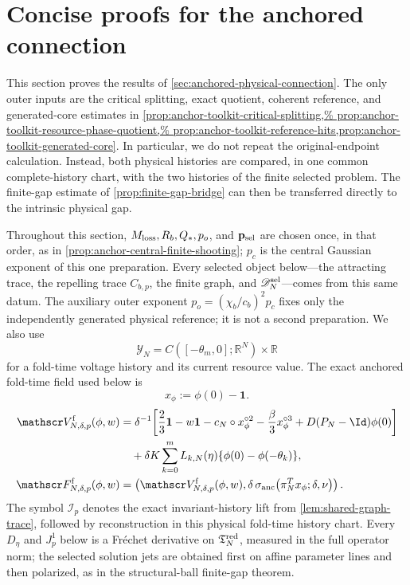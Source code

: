 \section{Concise proofs for the anchored connection}
\label{sec:lean-anchor-proofs}

This section proves the results of
\cref{sec:anchored-physical-connection}.  The only outer inputs are the
critical splitting, exact quotient, coherent reference, and generated-core
estimates in
\cref{prop:anchor-toolkit-critical-splitting,%
prop:anchor-toolkit-resource-phase-quotient,%
prop:anchor-toolkit-reference-hits,prop:anchor-toolkit-generated-core}.
In particular, we do not repeat
the original-endpoint calculation.  Instead, both physical histories are
compared, in one common complete-history chart, with the two histories of
the finite selected problem.  The finite-gap estimate of
\cref{prop:finite-gap-bridge} can then be transferred directly to the
intrinsic physical gap.

Throughout this section, \(M_{\rm loss},R_b,Q_*,p_o\), and
\(\mathbf p_{\rm sel}\) are chosen once, in that order, as in
\cref{prop:anchor-central-finite-shooting}; \(p_c\) is the central Gaussian
exponent of this one preparation.  Every selected object below---the attracting trace, the repelling
trace \(C_{b,p}\), the finite graph, and
\(\mathscr D_N^{\rm sel}\)---comes from this same datum.  The auxiliary
outer exponent \(p_o=(\chi_b/c_b)^2p_c\) fixes only the independently
generated physical reference; it is not a second preparation.  We also use
\[
 \mathscr Y_N=C([-\theta_m,0];\mathbb R^N)\times\mathbb R
\]
for a fold-time voltage history and its current resource value.  The exact
anchored fold-time field used below is
\[
 x_\phi:=\phi(0)-\mathbf1.
\]
\begin{align*}
 \mathscr V^{\rm f}_{N,\delta,p}(\phi,w)
 &=
 \delta^{-1}\!\left[
  \frac23\mathbf1-w\mathbf1
  -c_N\circ x_\phi^{\circ2}
  -\frac\beta3x_\phi^{\circ3}
  +D(P_N-\Id)\phi(0)\right]\\
 &\quad
  +\delta K\sum_{k=0}^mL_{k,N}(\eta)
       \{\phi(0)-\phi(-\theta_k)\},\\
 \mathscr F^{\rm f}_{N,\delta,p}(\phi,w)
 &=\left(\mathscr V^{\rm f}_{N,\delta,p}(\phi,w),
  \delta\,\sigma_{\rm anc}
   \bigl(\pi_N^Tx_\phi;\delta,\nu\bigr)\right).
\end{align*}
The symbol \(\mathcal I_p\) denotes the exact invariant-history lift from
\cref{lem:shared-graph-trace}, followed by reconstruction in this physical
fold-time history chart.
Every \(D_\eta\) and \(J_p^1\) below is a Fr\'echet derivative on
\(\mathfrak T_N^{\rm red}\), measured in the full operator norm; the
selected solution jets are obtained first on affine parameter lines and
then polarized, as in the structural-ball finite-gap theorem.


